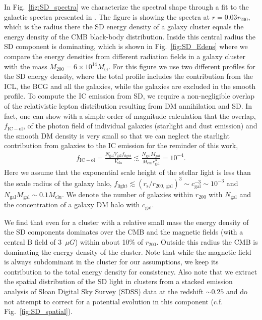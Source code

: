 \documentclass[10pt,aps,pra,reprint,amsmath,amsfonts,amssymb,showpacs,nofootinbib,floatfix]{revtex4-1}
\newcommand{\rmn}{\mathrm}
\newcommand{\msun}{M_\odot}
\newcommand{\rvir}{r_{200}}
\newcommand{\mvir}{M_{200}}
\begin{document}
In Fig.~\ref{fig:SD_spectra} we characterize the spectral shape
through a fit to the galactic spectra presented in
\cite{2006ApJ...648L..29P}.  The figure is showing the spectra at
$r=0.03\rvir$, which is the radius there the SD energy density of a
galaxy cluster equals the energy density of the CMB black-body
distribution. Inside this central radius the SD component is
dominating, which is shown in Fig.~\ref{fig:SD_Edens} where we compare
the energy densities from different radiation fields in a galaxy
cluster with the mass $\mvir=6\times10^{14}\msun$. For this figure we
use two different profiles for the SD energy density, where the total
profile includes the contribution from the ICL, the BCG and all the
galaxies, while the galaxies are excluded in the smooth profile. To
compute the IC emission from SD, we require a non-negligible overlap
of the relativistic lepton distribution resulting from DM annihilation
and SD.  In fact, one can show with a simple order of magnitude
calculation that the overlap, $f_\rmn{IC-ol}$, of the photon field of
individual galaxies (starlight and dust emission) and the smooth DM
density is very small so that we can neglect the starlight
contribution from galaxies to the IC emission for the reminder of this
work,
\begin{eqnarray}
\label{eq:SD_overlap}
f_\rmn{IC-ol} = \frac{N_\rmn{gal} V_\rmn{gal} f_\rmn{light}}{V_\rmn{clu}}
\lesssim  \frac{N_\rmn{gal} M_\rmn{gal}}{M_\rmn{clu}\,c_\rmn{gal}^{3}}=10^{-4}.
\end{eqnarray}
Here we assume that the exponential scale height of the stellar light
is less than the scale radius of the galaxy halo, $f_\rmn{light}
\lesssim (r_\rmn{s} / r_{200,~\rmn{gal}})^3 \sim c_\rmn{gal}^{-3} \sim
10^{-3}$ and $N_\rmn{gal} M_\rmn{gal} \sim 0.1 M_\rmn{clu}$. We denote
the number of galaxies within $\rvir$ with $N_\rmn{gal}$ and the
concentration of a galaxy DM halo with $c_\rmn{gal}$.

We find that even for a cluster with a relative small mass the energy
density of the SD components dominates over the CMB and the magnetic
fields (with a central B field of 3~$\mu G$) within about 10\% of
$\rvir$. Outside this radius the CMB is dominating the energy density
of the cluster.  Note that while the magnetic field is always
subdominant in the cluster for our assumptions, we keep its
contribution to the total energy density for consistency. Also note
that we extract the spatial distribution of the SD light in clusters
from a stacked emission analysis of Sloan Digital Sky Survey (SDSS)
data at the redshift $\sim 0.25$ \cite{2005MNRAS.358..949Z} and do not
attempt to correct for a potential evolution in this component
(c.f. Fig.~\ref{fig:SD_spatial}).
\end{document}

